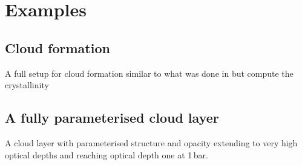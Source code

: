 \documentclass[12pt]{article}
\begin{document}
\section{Examples}

\subsection{Cloud formation}
A full setup for cloud formation similar to what was done in \cite{2020A&A...642A..28M} but compute the crystallinity
\\

\subsection{A fully parameterised cloud layer}
A cloud layer with parameterised structure and opacity extending to very high optical depths and reaching optical depth one at 1\,bar.
\\
\\
\\


\end{document}

